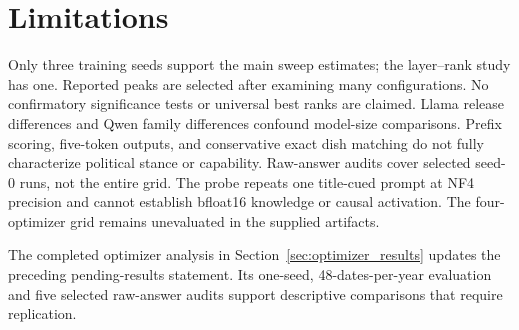 \section*{Limitations}
Only three training seeds support the main sweep estimates; the layer--rank study has one. Reported peaks are selected after examining many configurations. No confirmatory significance tests or universal best ranks are claimed. Llama release differences and Qwen family differences confound model-size comparisons. Prefix scoring, five-token outputs, and conservative exact dish matching do not fully characterize political stance or capability. Raw-answer audits cover selected seed-0 runs, not the entire grid. The probe repeats one title-cued prompt at NF4 precision and cannot establish bfloat16 knowledge or causal activation. The four-optimizer grid remains unevaluated in the supplied artifacts.

The completed optimizer analysis in Section~\ref{sec:optimizer_results} updates the preceding pending-results statement. Its one-seed, 48-dates-per-year evaluation and five selected raw-answer audits support descriptive comparisons that require replication.

